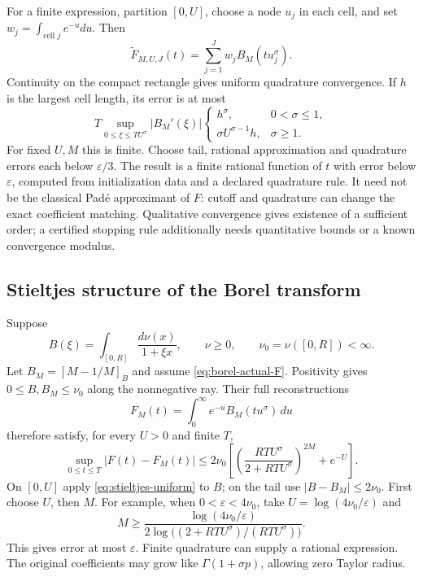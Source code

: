 For a finite expression, partition $[0,U]$, choose a node $u_j$ in
each cell, and set $w_j=\int_{\text{cell }j}e^{-u}du$. Then
\[
 \widetilde F_{M,U,J}(t)=\sum_{j=1}^{J}w_jB_M(tu_j^\sigma).
\]
Continuity on the compact rectangle gives uniform quadrature convergence.
If $h$ is the largest cell length, its error is at most
\[
 T\sup_{0\le\xi\le TU^\sigma}|B_M'(\xi)|
 \begin{cases}
 h^\sigma,&0<\sigma\le1,\\
 \sigma U^{\sigma-1}h,&\sigma\ge1.
 \end{cases}
\]
For fixed $U,M$ this is finite. Choose tail, rational approximation and
quadrature errors each below $\varepsilon/3$. The result is a finite
rational function of $t$ with error below $\varepsilon$, computed from
initialization data and a declared quadrature rule. It need not be the
classical Pad\'e approximant of $F$: cutoff and quadrature can change the
exact coefficient matching. Qualitative convergence gives existence of
a sufficient order; a certified stopping rule additionally needs
quantitative bounds or a known convergence modulus.

\subsection{Stieltjes structure of the Borel transform}
\label{app:borel-stieltjes}

Suppose
\[
 B(\xi)=\int_{[0,R]}\frac{d\nu(x)}{1+\xi x},
 \qquad \nu\ge0,\qquad \nu_0=\nu([0,R])<\infty.
\]
Let $B_M=[M-1/M]_B$ and assume \eqref{eq:borel-actual-F}.
Positivity gives $0\le B,B_M\le\nu_0$ along the nonnegative ray.
Their full reconstructions
\[
 F_M(t)=\int_0^\infty e^{-u}B_M(tu^\sigma)\,du
\]
therefore satisfy, for every $U>0$ and finite $T$,
\begin{equation}
 \sup_{0\le t\le T}|F(t)-F_M(t)|
 \le 2\nu_0\left[
 \left(\frac{RTU^\sigma}{2+RTU^\sigma}\right)^{2M}+e^{-U}
 \right].
 \label{eq:borel-stieltjes-error}
\end{equation}
On $[0,U]$ apply \eqref{eq:stieltjes-uniform} to $B$; on the tail
use $|B-B_M|\le2\nu_0$. First choose $U$, then $M$. For example,
when $0<\varepsilon<4\nu_0$, take $U=\log(4\nu_0/\varepsilon)$ and
\[
 M\ge
 \frac{\log(4\nu_0/\varepsilon)}
 {2\log\bigl((2+RTU^\sigma)/(RTU^\sigma)\bigr)}.
\]
This gives error at most $\varepsilon$. Finite quadrature can supply
a rational expression. The original coefficients may grow like
$\Gamma(1+\sigma p)$, allowing zero Taylor radius.

